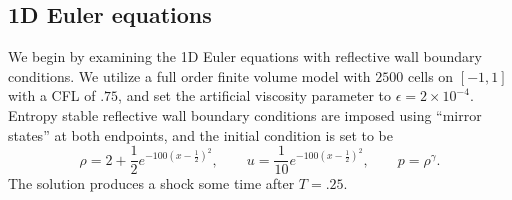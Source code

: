 \documentclass[preprint,10pt]{elsarticle}
\theoremstyle{definition}
\theoremstyle{lemma}
\theoremstyle{theorem}
\theoremstyle{assumption}
\newcommand{\LRp}[1]{\left( #1 \right)}
\begin{document}
\subsection{1D Euler equations}

We begin by examining the 1D Euler equations with reflective wall boundary conditions.  We utilize a full order finite volume model with $2500$ cells on $[-1,1]$ with a CFL of $.75$, and set the artificial viscosity parameter to $\epsilon = 2\times 10^{-4}$.  Entropy stable reflective wall boundary conditions are imposed using ``mirror states'' at both endpoints, and the initial condition is set to be 
\[
\rho = 2 + \frac{1}{2}e^{-100\LRp{x-\frac{1}{2}}^2}, \qquad 
    u = \frac{1}{10}e^{-100\LRp{x-\frac{1}{2}}^2}, \qquad p = \rho^{\gamma}.
\]
The solution produces a shock some time after $T=.25$.  
\end{document}
